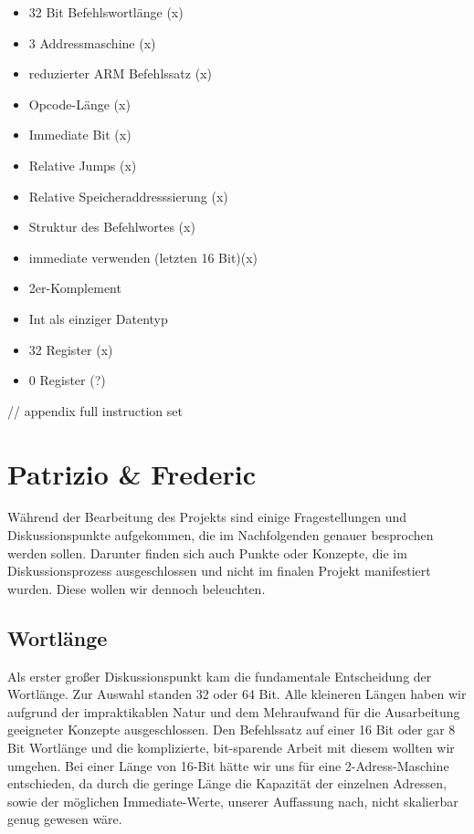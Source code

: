 \documentclass[paper=a4,fontsize=12pt]{scrreprt}
\begin{document}
\begin{itemize}
    \item 32 Bit Befehlswortlänge (x)
    \item 3 Addressmaschine (x)
    \item reduzierter ARM Befehlssatz (x)
    \item Opcode-Länge (x)
    \item Immediate Bit (x)
    \item Relative Jumps (x)
    \item Relative Speicheraddresssierung (x)
    \item Struktur des Befehlwortes (x)
    \item immediate verwenden (letzten 16 Bit)(x)
    \item 2er-Komplement
    \item Int als einziger Datentyp
    \item 32 Register (x)
    \item 0 Register (?)

\end{itemize}

// appendix full instruction set

\section{Patrizio \& Frederic}

Während der Bearbeitung des Projekts sind einige Fragestellungen und Diskussionspunkte aufgekommen, die im Nachfolgenden genauer besprochen werden sollen. Darunter finden sich auch Punkte oder Konzepte, die im Diskussionsprozess ausgeschlossen und nicht im finalen Projekt manifestiert wurden. Diese wollen wir dennoch beleuchten.

\subsection{Wortlänge}

Als erster großer Diskussionspunkt kam die fundamentale Entscheidung der Wortlänge. Zur Auswahl standen 32 oder 64 Bit. Alle kleineren Längen haben wir aufgrund der impraktikablen Natur und dem Mehraufwand für die Ausarbeitung geeigneter Konzepte ausgeschlossen. Den Befehlssatz auf einer 16 Bit oder gar 8 Bit Wortlänge und die komplizierte, bit-sparende Arbeit mit diesem wollten wir umgehen. Bei einer Länge von 16-Bit hätte wir uns für eine 2-Adress-Maschine entschieden, da durch die geringe Länge die Kapazität der einzelnen Adressen, sowie der möglichen Immediate-Werte, unserer Auffassung nach, nicht skalierbar genug gewesen wäre.
\end{document}
